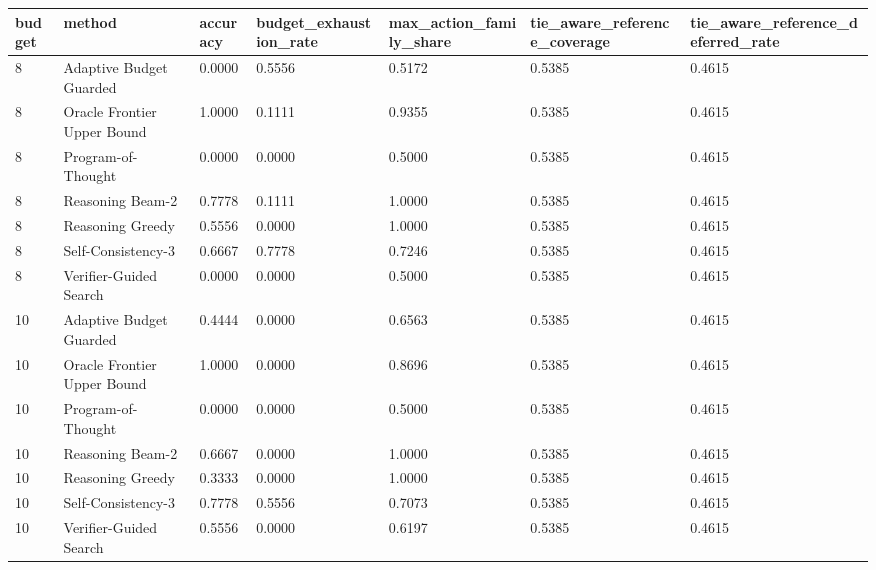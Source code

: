 \begin{tabular}{lllllll}
\hline
budget & method & accuracy & budget_exhaustion_rate & max_action_family_share & tie_aware_reference_coverage & tie_aware_reference_deferred_rate \\
\hline
8 & Adaptive Budget Guarded & 0.0000 & 0.5556 & 0.5172 & 0.5385 & 0.4615 \\
8 & Oracle Frontier Upper Bound & 1.0000 & 0.1111 & 0.9355 & 0.5385 & 0.4615 \\
8 & Program-of-Thought & 0.0000 & 0.0000 & 0.5000 & 0.5385 & 0.4615 \\
8 & Reasoning Beam-2 & 0.7778 & 0.1111 & 1.0000 & 0.5385 & 0.4615 \\
8 & Reasoning Greedy & 0.5556 & 0.0000 & 1.0000 & 0.5385 & 0.4615 \\
8 & Self-Consistency-3 & 0.6667 & 0.7778 & 0.7246 & 0.5385 & 0.4615 \\
8 & Verifier-Guided Search & 0.0000 & 0.0000 & 0.5000 & 0.5385 & 0.4615 \\
10 & Adaptive Budget Guarded & 0.4444 & 0.0000 & 0.6563 & 0.5385 & 0.4615 \\
10 & Oracle Frontier Upper Bound & 1.0000 & 0.0000 & 0.8696 & 0.5385 & 0.4615 \\
10 & Program-of-Thought & 0.0000 & 0.0000 & 0.5000 & 0.5385 & 0.4615 \\
10 & Reasoning Beam-2 & 0.6667 & 0.0000 & 1.0000 & 0.5385 & 0.4615 \\
10 & Reasoning Greedy & 0.3333 & 0.0000 & 1.0000 & 0.5385 & 0.4615 \\
10 & Self-Consistency-3 & 0.7778 & 0.5556 & 0.7073 & 0.5385 & 0.4615 \\
10 & Verifier-Guided Search & 0.5556 & 0.0000 & 0.6197 & 0.5385 & 0.4615 \\
\hline
\end{tabular}
